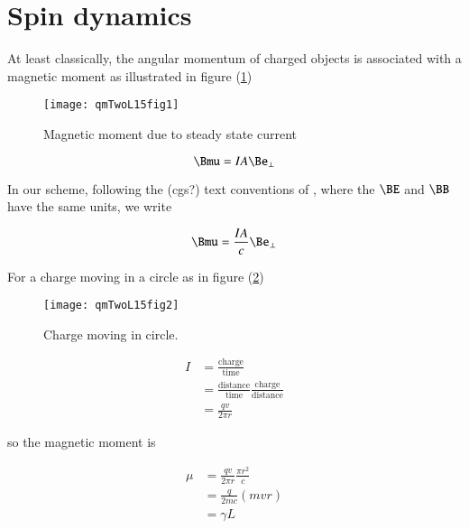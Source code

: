 

\section{Spin dynamics}

At least classically, the angular momentum of charged objects is associated with a magnetic moment as illustrated in figure (\ref{fig:qmTwoL15:qmTwoL15fig1})

\begin{figure}[htp]
   \centering
   \texttt{[image: qmTwoL15fig1]}
   \caption{Magnetic moment due to steady state current}\label{fig:qmTwoL15:qmTwoL15fig1}
\end{figure}

\begin{equation}\label{eqn:qmTwoL15:110}
\Bmu = I A \Be_\perp
\end{equation}

In our scheme, following the (cgs?) text conventions of \cite{desai2009quantum}, where the $\BE$ and $\BB$ have the same units, we write

\begin{equation}\label{eqn:qmTwoL15:130}
\Bmu = \frac{I A}{c} \Be_\perp
\end{equation}

For a charge moving in a circle as in figure (\ref{fig:qmTwoL15:qmTwoL15fig2})
\begin{figure}[htp]
   \centering
   \texttt{[image: qmTwoL15fig2]}
   \caption{Charge moving in circle.}\label{fig:qmTwoL15:qmTwoL15fig2}
\end{figure}

\begin{equation}\label{eqn:qmTwoL15:150}
\begin{aligned}
I 
&= \frac{\text{charge}}{\text{time}} \\
&= 
\frac{\text{distance}}{\text{time}} \frac{\text{charge}}{\text{distance}} \\
&= 
\frac{q v}{ 2 \pi r}
\end{aligned}
\end{equation}

so the magnetic moment is 

\begin{equation}\label{eqn:qmTwoL15:170}
\begin{aligned}
\mu 
&= \frac{q v}{ 2 \pi r} \frac{\pi r^2}{c}  \\
&= \frac{q }{ 2 m c } (m v r) \\
&= \gamma L
\end{aligned}
\end{equation}

